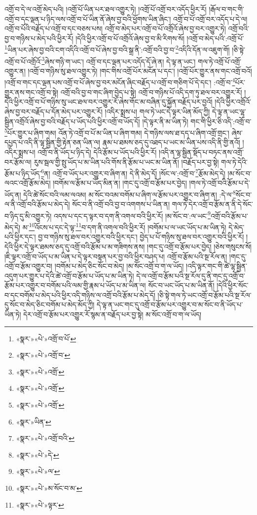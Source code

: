 འགྲོ་བ་དེ་ལ་འགྲོ་མེད་པའི། །འགྲོ་པོ་ཡིན་པར་ཐལ་འགྱུར་ཏེ། །འགྲོ་པོ་འགྲོ་བར་འདོད་ཕྱིར་རོ། །རྒོལ་བ་གང་གི་འགྲོ་བ་དང་ལྡན་པ་ཉིད་ལས་འགྲོ་བ་པོ་ཡིན་ནོ་ཞེས་བྱ་བའི་ཕྱོགས་ཡིན་ཞིང་། འགྲོ་བ་པོ་འགྲོ་བར་འདོད་པ་དེ་ལ། འགྲོ་བ་པོའི་བརྗོད་པ་འགྲོ་བ་དང་བཅས་པས། འགྲོ་བ་མེད་པར་འགྲོ་བ་པོ་འགྲོའོ་ཞེས་བྱ་བར་འགྱུར་ཏེ། འགྲོ་བའི་བྱ་བ་གཉིས་པ་མེད་པའི་ཕྱིར་རོ། །དེའི་ཕྱིར་འགྲོ་བ་པོ་འགྲོའོ་ཞེས་བྱ་བ་མི་རིགས་སོ། །འགྲོ་བ་མེད་པའི་:འགྲོ་པོ་\footnote{«སྣར་»«པེ་»འགྲོ་བ་པོ་}ཡིན་པར་ཞེས་བྱ་བའི་ངག་འདིའི་འགྲོ་བ་པོ་ཞེས་བྱ་བའི་སྒྲ་ནི་:འགྲོ་བའི་བྱ་བ་\footnote{«སྣར་»«པེ་»འགྲོ་བ་}འདིའི་དོན་ལ་འཇུག་གོ། །ཅི་སྟེ་འགྲོ་བ་པོ་འགྲོའོ་\footnote{«སྣར་»«པེ་»འགྲོ་}ཞེས་གཉི་ག་ཡང་། འགྲོ་བ་དང་ལྡན་པར་འདོད་དོ་ཞེ་ན། དེ་ལྟ་ན་ཡང་། གལ་ཏེ་འགྲོ་པོ་འགྲོ་འགྱུར་ན། །འགྲོ་བ་གཉིས་སུ་ཐལ་འགྱུར་ཏེ། །གང་གིས་འགྲོ་པོར་མངོན་པ་དང་། །འགྲོ་པོར་གྱུར་ནས་གང་འགྲོ་བའོ། །འགྲོ་བ་གང་དང་ལྡན་པས་འགྲོ་བ་པོ་ཞེས་བྱ་བར་མངོན་ཞིང་བརྗོད་པ་འགྲོ་བ་གཅིག་པོ་དེ་དང་། :འགྲོ་བ་\footnote{«སྣར་»«པེ་»འགྲོ་}པོར་གྱུར་ནས་གང་འགྲོ་བ་སྟེ། འགྲོ་བའི་བྱ་བ་གང་ཞིག་བྱེད་པ་སྟེ། འགྲོ་བ་གཉིས་པོ་འདི་དག་ཏུ་ཐལ་བར་འགྱུར་རོ། །དེའི་ཕྱིར་འགྲོ་བ་པོ་གཉིས་སུ་ཡང་ཐལ་བར་འགྱུར་རོ་ཞེས་གོང་མ་བཞིན་དུ་སྐྱོན་བརྗོད་པར་བྱའོ། །དེའི་ཕྱིར་འགྲོའོ་ཞེས་བྱ་བར་བརྗོད་པ་དོན་མེད་པར་འགྱུར་རོ། །འདིར་སྨྲས་པ། གལ་ཏེ་ཡང་དེ་ལྟར་ཡིན་མོད་ཀྱི། དེ་ལྟ་ན་ཡང་ལྷ་སྦྱིན་འགྲོའོ་ཞེས་བྱ་བའི་བརྗོད་པ་ཡོད་པའི་ཕྱིར་འགྲོ་བ་ཡོད་དོ། །དེ་ལྟར་ནི་མ་ཡིན་ཏེ། གང་གི་ཕྱིར་ཅི་འདི་:འགྲོ་བ་\footnote{«སྣར་»«པེ་»འགྲོ་}པོར་གྱུར་པ་ཞིག་གམ། འོན་ཏེ་འགྲོ་བ་པོ་མ་ཡིན་པ་ཞིག་གམ། དེ་གཉིས་ལས་ཐ་དད་པ་ཞིག་འགྲོ་གྲང་། ཞེས་དཔྱད་པ་འདི་ནི་ལྷ་སྦྱིན་གྱི་རྟེན་ཅན་ཡིན་ལ། རྣམ་པ་ཐམས་ཅད་དུ་འཐད་པ་ཡང་མ་ཡིན་པས་འདི་ནི་གྱི་ནའོ། །འདིར་སྨྲས་པ། འགྲོ་བ་ནི་ཡོད་པ་ཉིད་དེ། དེའི་རྩོམ་པ་ཡོད་པའི་ཕྱིར་རོ། །འདི་ན་ལྷ་སྦྱིན་སྡོད་པ་བཏང་ནས་འགྲོ་བར་རྩོམ་ལ། རུས་སྦལ་གྱི་སྤུ་ཡོད་པ་མ་ཡིན་པའི་གོས་ནི་རྩོམ་པ་ཡང་མ་ཡིན་ནོ། །བརྗོད་པར་བྱ་སྟེ། གལ་ཏེ་དེའི་རྩོམ་པ་ཉིད་ཡོད་\footnote{«སྣར་»ཡིན་}ན། འགྲོ་བ་ཡོད་པར་འགྱུར་བ་ཞིག་ན། དེ་ནི་མེད་དོ། །སོང་ལ་:འགྲོ་བ་\footnote{«སྣར་»«པེ་»འགྲོ་བའི་}རྩོམ་མེད་དེ། །མ་སོང་བ་ལའང་འགྲོ་རྩོམ་མེད། །བགོམ་ལ་རྩོམ་པ་ཡོད་མིན་ན། །གང་དུ་འགྲོ་བ་རྩོམ་པར་བྱེད། །གལ་ཏེ་འགྲོ་བའི་རྩོམ་པ་དེ་ཡོད་ན། དེའི་ཚེ་སོང་བའི་ལམ་ལའམ། མ་སོང་བའམ་བགོམ་པ་ཞིག་ལ་རྩོམ་པར་འགྱུར་བ་ཞིག་ན། :དེ་ལ་\footnote{«སྣར་»«པེ་»དེ་}སོང་བ་ལ་ནི་འགྲོ་བའི་རྩོམ་པ་མེད་དེ། སོང་བ་ནི་འགྲོ་བའི་བྱ་བ་འགགས་པ་ཡིན་ན། གལ་ཏེ་དེར་འགྲོ་བ་རྩོམ་ན་ནི་དེ་སོང་བ་ཉིད་དུ་མི་འགྱུར་ཏེ། འདས་པ་དང་ད་ལྟར་བ་དག་ནི་འགལ་བའི་ཕྱིར་རོ། །མ་སོང་བ་:ལ་ཡང་\footnote{«སྣར་»«པེ་»ལ་}འགྲོ་བའི་རྩོམ་པ་མེད་དེ། མ་\footnote{«སྣར་»«པེ་»མ་སོང་བ་མ་}འོངས་པ་དང་དེ་ལྟ་\footnote{«སྣར་»«པེ་»ལྟར་}བ་དག་ནི་འགལ་བའི་ཕྱིར་རོ། །བགོམ་པ་ལ་ཡང་ཡོད་པ་མ་ཡིན་ཏེ། དེ་མེད་པའི་ཕྱིར་དང་། བྱ་བ་གཉིས་སུ་ཐལ་བར་འགྱུར་བའི་ཕྱིར་དང་། བྱེད་པ་པོ་གཉིས་སུ་ཐལ་བར་འགྱུར་བའི་ཕྱིར་རོ། །དེའི་ཕྱིར་དེ་ལྟར་ཐམས་ཅད་དུ་འགྲོ་བའི་རྩོམ་པ་མ་གཟིགས་ནས། །གང་དུ་འགྲོ་བ་རྩོམ་པར་བྱེད། །ཅེས་གསུངས་སོ། །ཇི་ལྟར་འགྲོ་བ་ཡོད་པ་མ་ཡིན་པ་དེ་ལྟར་བསྟན་པར་བྱ་བའི་ཕྱིར་བཤད་པ། འགྲོ་བ་རྩོམ་པའི་སྔ་རོལ་ན། །གང་དུ་འགྲོ་བ་རྩོམ་འགྱུར་བ། །བགོམ་པ་མེད་ཅིང་སོང་བ་མེད། །མ་སོང་འགྲོ་བ་ག་ལ་ཡོད། །འདི་ལྟར་གང་གི་ཚེ་ལྷ་སྦྱིན་འདུག་པར་གྱུར་པ་དེའི་ཚེ་འགྲོ་བ་རྩོམ་པ་ཡོད་པ་མ་ཡིན་ཏེ། དེ་ལ་འགྲོ་བ་རྩོམ་པའི་སྔ་རོལ་དུ་ནི་གང་དུ་འགྲོ་བ་རྩོམ་པར་འགྱུར་བ་བགོམ་པའི་ལམ་གྱི་རྣམ་པ་ཡོད་པ་མ་ཡིན་ལ། སོང་བ་ཡང་ཡོད་པ་མ་ཡིན་ནོ། །དེའི་ཕྱིར་སོང་བ་དང་བགོམ་པ་མེད་པའི་ཕྱིར་འདི་གཉིས་ལ་འགྲོ་བའི་རྩོམ་པ་མེད་དོ། །ཅི་སྟེ་གལ་ཏེ་ཡང་འགྲོ་བ་རྩོམ་པའི་སྔ་རོལ་དུ་སོང་བ་མེད་ཅིང་བགོམ་པ་མེད་མོད་ཀྱི། དེ་ལྟ་ན་ཡང་གང་དུ་འགྲོ་བ་རྩོམ་པར་འགྱུར་བ་མ་སོང་བ་ནི་ཡོད་པ་ཡིན་ཏེ། དེར་འགྲོ་བ་རྩོམ་པར་འགྱུར་རོ་སྙམ་ན་བརྗོད་པར་བྱ་སྟེ། མ་སོང་འགྲོ་བ་ག་ལ་ཡོད། 